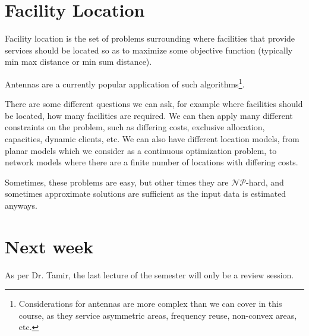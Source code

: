 \documentclass{idc_msc}
\newcommand{\NPclass}{\mathcal{NP}}
\begin{document}
\section{Facility Location}

Facility location is the set of problems surrounding where facilities that provide services should be located so as to maximize some objective function (typically min max distance or min sum distance).

Antennas are a currently popular application of such algorithms\footnote{Considerations for antennas are more complex than we can cover in this course, as they service asymmetric areas, frequency reuse, non-convex areas, etc.}.

There are some different questions we can ask, for example where facilities should be located, how many facilities are required.
We can then apply many different constraints on the problem, such as differing costs, exclusive allocation, capacities, dynamic clients, etc.
We can also have different location models, from planar models which we consider as a continuous optimization problem, to network models where there are a finite number of locations with differing costs.

Sometimes, these problems are easy, but other times they are \(\NPclass\)-hard, and sometimes approximate solutions are sufficient as the input data is estimated anyways.

\section{Next week}

As per Dr. Tamir, the last lecture of the semester will only be a review session.
\end{document}
